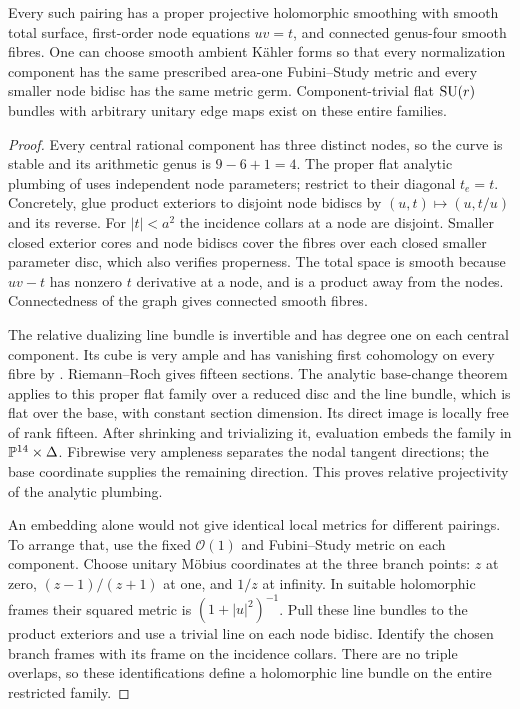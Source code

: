 \begin{proposition}\label{prop:common-local-metrics}
Every such pairing has a proper projective
holomorphic smoothing with smooth total
surface, first-order node equations
$uv=t$, and connected genus-four smooth
fibres. One can choose smooth ambient
Kähler forms so that every normalization
component has the same prescribed
area-one Fubini--Study metric and every
smaller node bidisc has the same metric
germ. Component-trivial flat $\operatorname{SU}(r)$
bundles with arbitrary unitary edge
maps exist on these entire families.
\end{proposition}
\begin{proof}
Every central rational component has
three distinct nodes, so the curve is
stable and its arithmetic genus is
$9-6+1=4$. The proper flat analytic
plumbing of
\cite[Section~8.3 of the preprint version]{hubbard-koch}
uses independent node parameters;
restrict to their diagonal $t_e=t$.
Concretely, glue product exteriors to
disjoint node bidiscs by
$(u,t)\mapsto(u,t/u)$ and its reverse.
For $|t|<a^2$ the incidence collars at
a node are disjoint. Smaller closed
exterior cores and node bidiscs cover
the fibres over each closed smaller
parameter disc, which also verifies
properness. The total space is smooth
because $uv-t$ has nonzero $t$
derivative at a node, and is a product
away from the nodes. Connectedness
of the graph gives connected smooth
fibres.

The relative dualizing line bundle is
invertible and has degree one on each
central component. Its cube is very
ample and has vanishing first
cohomology on every fibre by
\cite[Theorem~1.2]{deligne-mumford}.
Riemann--Roch gives fifteen sections.
The analytic base-change theorem
\cite[Section~7, Satz~5]{grauert}
applies to this proper flat family
over a reduced disc and the line
bundle, which is flat over the base,
with constant section
dimension. Its direct image is
locally free of rank fifteen.
After shrinking and trivializing it,
evaluation embeds the family in
$\mathbb P^{14}\times\Delta$.
Fibrewise very ampleness separates
the nodal tangent directions; the
base coordinate supplies the remaining
direction. This proves relative
projectivity of the analytic plumbing.

An embedding alone would not give
identical local metrics for different
pairings. To arrange that, use the
fixed $\mathcal O(1)$ and Fubini--Study
metric on each component. Choose
unitary Möbius coordinates at the
three branch points: $z$ at zero,
$(z-1)/(z+1)$ at one, and $1/z$ at
infinity. In suitable holomorphic
frames their squared metric is
$(1+|u|^2)^{-1}$.
Pull these line bundles to the
product exteriors and use a trivial
line on each node bidisc. Identify
the chosen branch frames with its
frame on the incidence collars.
There are no triple overlaps, so
these identifications define a
holomorphic line bundle on the
entire restricted family.


\end{proof}
